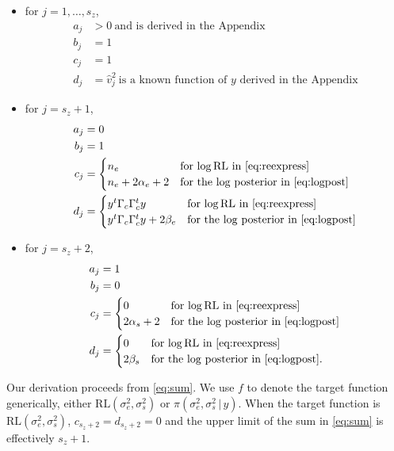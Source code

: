 \documentclass[ejs]{imsart}
\newcommand{\RLorig}{\text{RL}}
\newcommand{\logRLorig}{\log\RLorig}
\newcommand{\sigssq}{\sigma_s^2}
\newcommand{\sigesq}{\sigma_e^2}
\newcommand{\g}{\,|\,}
\begin{document}
\begin{itemize}[label=---]
\item for $j = 1, \dots, s_z$,
  \begin{align*}
    a_j &> 0\ \text{and is derived in the Appendix}\\
    b_j &=1\\
    c_j &=1\\
    d_j &= \hat v_j^2\ \text{is a known function of $y$ derived in the Appendix}
  \end{align*}
\item for $j = s_z +1$,
  \begin{align*}
    a_j &= 0\\
    b_j &= 1\\
    c_j &= \begin{cases}
                 n_e & \text{for $\logRLorig$ in \eqref{eq:reexpress}}\\
                 n_e + 2\alpha_e + 2 & \text{for the $\log$ posterior in \eqref{eq:logpost}}
              \end{cases}\\
    d_j &= \begin{cases}
                 y^t \Gamma_c \Gamma^t_c y & \text{for $\logRLorig$ in \eqref{eq:reexpress}}\\
                 y^t \Gamma_c \Gamma^t_c y + 2\beta_e & \text{for the $\log$ posterior in \eqref{eq:logpost}}
              \end{cases}
  \end{align*}
\item for $j = s_z+2$,
  \begin{align*}
    a_j &= 1\\
    b_j &= 0\\
    c_j &= \begin{cases}
      0 & \text{for $\logRLorig$ in \eqref{eq:reexpress}}\\
      2 \alpha_s + 2 & \text{for the $\log$ posterior in \eqref{eq:logpost}}
    \end{cases}\\
    d_j &= \begin{cases}
      0 & \text{for $\logRLorig$ in \eqref{eq:reexpress}}\\
      2 \beta_s & \text{for the $\log$ posterior in \eqref{eq:logpost}}.
    \end{cases}
  \end{align*}
\end{itemize}
Our derivation proceeds from \eqref{eq:sum}.  We use $f$ to denote the target function generically, either $\RLorig(\sigesq,\sigssq)$ or $\pi(\sigesq,\sigssq\g y)$.  When the target function is $\RLorig(\sigesq,\sigssq)$, $c_{s_z+2} = d_{s_z+2} = 0$ and the upper limit of the sum in \eqref{eq:sum} is effectively $s_z+1$.
\end{document}
